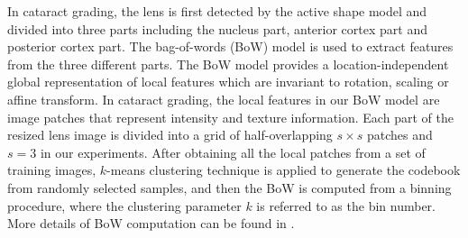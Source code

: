 \documentclass[journal]{IEEEtran}
\begin{document}
 In cataract grading,  the lens is first detected by the active shape model \cite{5415679} and divided into three parts including the nucleus part, anterior cortex part and posterior cortex part.  The  bag-of-words (BoW) model \cite{bow} is used to extract features   from the three different parts.
 The BoW model provides a location-independent global representation of local features
 which are invariant to    rotation, scaling or affine transform.  In cataract grading, the local features in our BoW model are image patches that represent  intensity and texture information. Each part of the resized lens image is divided into  a grid of half-overlapping $s\times s$  patches and $s=3$ in our experiments.
 After obtaining all the local patches from a set of training images, $k$-means clustering technique is applied to generate the codebook from randomly selected samples, and then the BoW is computed  from a binning procedure, where the clustering parameter $k$ is referred to as the bin number.
 More details of BoW computation can be found in \cite{bow}.
\end{document}
